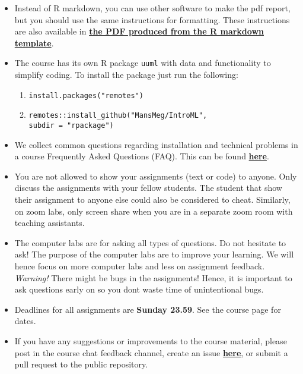\begin{itemize}
\item Instead of R markdown, you can use other software to make the pdf report, but you should use the same instructions for formatting. These instructions are also available in \href{https://raw.githubusercontent.com/MansMeg/IntroML/master/templates/assignment_template.pdf}{\textbf{the PDF produced from the R markdown template}}.

\item The course has its own R package \texttt{uuml} with data and functionality to simplify coding. To install the package just run the following:
\begin{enumerate}
\item \texttt{install.packages("remotes")}
\item \texttt{remotes::install\_github("MansMeg/IntroML", \\ subdir = "rpackage")}
\end{enumerate}


\item We collect common questions regarding installation and technical problems in a course Frequently Asked Questions (FAQ). This can be found \href{https://github.com/MansMeg/IntroML/blob/master/FAQ.md}{\textbf{here}}.

\item You are not allowed to show your assignments (text or code) to anyone. Only discuss the assignments with your fellow students. The student that show their assignment to anyone else could also be considered to cheat. Similarly, on zoom labs, only screen share when you are in a separate zoom room with teaching assistants.

\item The computer labs are for asking all types of questions. Do not hesitate to ask! The purpose of the computer labs are to improve your learning. We will hence focus on more computer labs and less on assignment feedback. \emph{Warning!} There might be bugs in the assignments! Hence, it is important to ask questions early on so you dont waste time of unintentional bugs.

\item Deadlines for all assignments are \textbf{Sunday 23.59}. See the course page for dates.

\item If you have any suggestions or improvements to the course material, please post in the course chat feedback channel, create an issue \href{https://github.com/MansMeg/IntroML/issues}{\textbf{here}}, or submit a pull request to the public repository.

\end{itemize}

